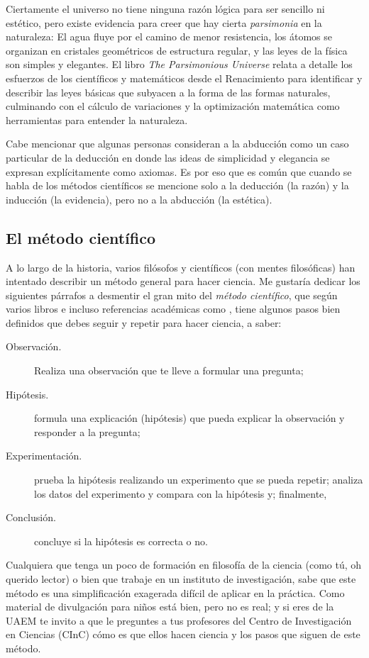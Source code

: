 Ciertamente el universo no tiene ninguna razón lógica para ser sencillo ni
estético, pero existe evidencia para creer que hay cierta \emph{parsimonia} en
la naturaleza:
El agua fluye por el camino de menor resistencia, los átomos se organizan en
cristales geométricos de estructura regular, y las leyes de la física son
simples y elegantes.
El libro \emph{The Parsimonious Universe}\cite{Hildebrandt2012} relata a detalle
los esfuerzos de los científicos y matemáticos desde el Renacimiento para
identificar y describir las leyes básicas que subyacen a la forma de las formas
naturales, culminando con el cálculo de variaciones y la optimización matemática
como herramientas para entender la naturaleza.

Cabe mencionar que algunas personas consideran a la abducción como un caso
particular de la deducción en donde las ideas de simplicidad y elegancia se
expresan explícitamente como axiomas.
Es por eso que es común que cuando se habla de los métodos científicos se
mencione solo a la deducción (la razón) y la inducción (la evidencia), pero no
a la abducción (la estética).

\subsection*{El método científico}
\label{sub:elmetodocientifico}
A lo largo de la historia, varios filósofos y científicos (con mentes
filosóficas) han intentado describir un método general para hacer ciencia.
Me gustaría dedicar los siguientes párrafos a desmentir el gran mito del
\emph{método científico}, que según varios libros e incluso referencias
académicas como \cite{Crawford1990}, tiene algunos pasos bien definidos que
debes seguir y repetir para hacer ciencia, a saber:
\begin{description}
    \item[Observación.] Realiza una observación que te lleve a formular
        una pregunta;
    \item[Hipótesis.] formula una explicación (hipótesis) que pueda explicar la
        observación y responder a la pregunta;
    \item[Experimentación.] prueba la hipótesis realizando un
        experimento que se pueda repetir; analiza los datos del experimento y
        compara con la hipótesis y; finalmente,
    \item[Conclusión.] concluye si la hipótesis es correcta o no.
\end{description}
Cualquiera que tenga un poco de formación en filosofía de la ciencia (como tú,
oh querido lector) o bien que trabaje en un instituto de investigación, sabe que
este método es una simplificación exagerada difícil de aplicar en la práctica.
Como material de divulgación para niños está bien, pero no es real; y si eres de
la UAEM te invito a que le preguntes a tus profesores del Centro de
Investigación en Ciencias (CInC) cómo es que ellos hacen ciencia y los pasos que
siguen de este método.

